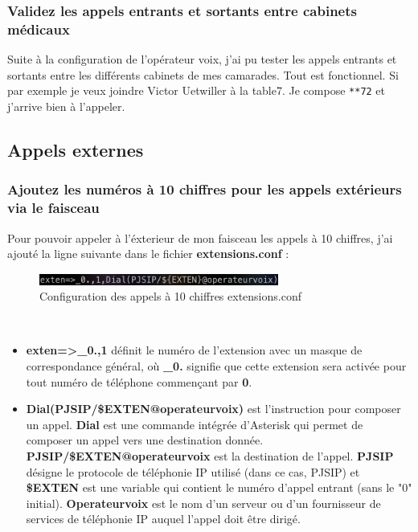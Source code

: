 \documentclass[12pt, a4paper]{article}
\begin{document}
	\subsubsection{Validez les appels entrants et sortants entre cabinets médicaux}
	Suite à la configuration de l'opérateur voix, j'ai pu tester les appels entrants et sortants entre les différents
	cabinets de mes camarades. Tout est fonctionnel. Si par exemple je veux joindre
	Victor Uetwiller à la table7. Je compose \texttt{**72} et j'arrive bien
	à l'appeler. 

	\subsection{Appels externes}
	\subsubsection{Ajoutez les numéros à 10 chiffres pour les appels extérieurs via le faisceau}
	Pour pouvoir appeler à l'éxterieur de mon faisceau les appels à 10 chiffres, j'ai ajouté la ligne
	suivante dans le fichier \textbf{extensions.conf} :
	\begin{figure}[h]
		\centering
		\includegraphics[width=0.7\textwidth]{img/externes.png}
		\caption{Configuration des appels à 10 chiffres extensions.conf}
		\label{fig:exter}
	\end{figure}\\

	\begin{itemize}
		\item \textbf{exten=>\_0.,1} définit le numéro de l'extension avec un masque de correspondance général, où \textbf{\_0.} signifie que cette extension sera activée pour tout numéro de téléphone commençant par \textbf{0}.\\
		\item \textbf{Dial(PJSIP/\${EXTEN}@operateurvoix)} est l'instruction pour composer un appel. \textbf{Dial} est une commande intégrée d'Asterisk qui permet de composer un appel vers une destination donnée. \textbf{PJSIP/\${EXTEN}@operateurvoix} est la destination de l'appel. \textbf{PJSIP} désigne le protocole de téléphonie IP utilisé (dans ce cas, PJSIP) et \textbf{\${EXTEN}} est une variable qui contient le numéro d'appel entrant (sans le "0" initial). \textbf{Operateurvoix} est le nom d'un serveur ou d'un fournisseur de services de téléphonie IP auquel l'appel doit être dirigé.
	\end{itemize}
\end{document}
